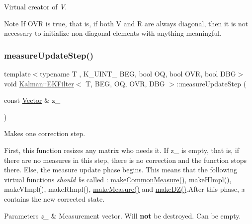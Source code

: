 Virtual creator of {\itshape V}. 

\begin{DoxyNote}{Note}
If {\ttfamily O\+VR} is {\ttfamily true}, that is, if {\ttfamily both} V and R are always diagonal, then it is not necessary to initialize non-\/diagonal elements with anything meaningful. 
\end{DoxyNote}
\mbox{\label{classKalman_1_1EKFilter_a01c2889b2229cb815f9e4b10b0402110}} 
\subsubsection{\texorpdfstring{measure\+Update\+Step()}{measureUpdateStep()}}
{\footnotesize\ttfamily template$<$typename T , K\+\_\+\+U\+I\+N\+T\+\_ B\+EG, bool OQ, bool O\+VR, bool D\+BG$>$ \\
void \mbox{\hyperlink{classKalman_1_1EKFilter}{Kalman\+::\+E\+K\+Filter}}$<$ T, B\+EG, OQ, O\+VR, D\+BG $>$\+::measure\+Update\+Step (\begin{DoxyParamCaption}\item[{const \mbox{\hyperlink{classKalman_1_1EKFilter_af773d1217ecb01925b857d49b32bc636}{Vector}} \&}]{z\+\_\+ }\end{DoxyParamCaption})}



Makes one correction step. 

First, this function resizes any matrix who needs it. If {\ttfamily z\+\_\+} is empty, that is, if there are no measures in this step, there is no correction and the function stops there. Else, the measure update phase begins. This means that the following virtual functions {\itshape should be} called \+: {\ttfamily \mbox{\hyperlink{classKalman_1_1EKFilter_a89337cacd8115338ffd34637f0ecbd92}{make\+Common\+Measure()}}}, {\ttfamily make\+H\+Impl()}, {\ttfamily make\+V\+Impl()}, {\ttfamily make\+R\+Impl()}, {\ttfamily \mbox{\hyperlink{classKalman_1_1EKFilter_aac9f6d80e5ec9e6ea2ccf045cb682df8}{make\+Measure()}}} and {\ttfamily \mbox{\hyperlink{classKalman_1_1EKFilter_a54a168299879f6b3023b0a42b1afe29d}{make\+D\+Z()}}}.After this phase, {\itshape x} contains the new corrected state. 
\begin{DoxyParams}{Parameters}
{\em z\+\_\+} & Measurement vector. Will {\bfseries not} be destroyed. Can be empty. \\
\hline
\end{DoxyParams}
\mbox{\label{classKalman_1_1EKFilter_ae3350773ed390892c2dd6dfe9dfbca89}} 
